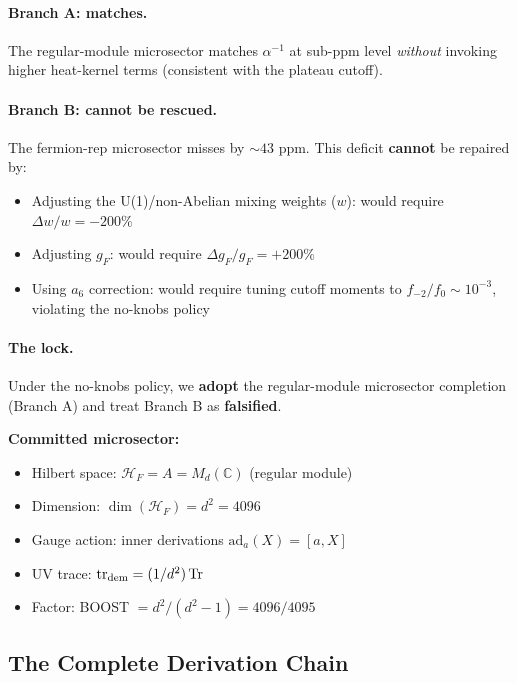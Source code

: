 \paragraph{Branch A: matches.}
The regular-module microsector matches $\alpha^{-1}$ at sub-ppm level \emph{without} invoking higher heat-kernel terms (consistent with the plateau cutoff).

\paragraph{Branch B: cannot be rescued.}
The fermion-rep microsector misses by $\sim 43$ ppm. This deficit \textbf{cannot} be repaired by:
\begin{itemize}
\item Adjusting the U(1)/non-Abelian mixing weights ($w$): would require $\Delta w/w = -200\%$
\item Adjusting $g_F$: would require $\Delta g_F/g_F = +200\%$
\item Using $a_6$ correction: would require tuning cutoff moments to $f_{-2}/f_0 \sim 10^{-3}$, violating the no-knobs policy
\end{itemize}
\paragraph{The lock.}\mbox{}

\begin{tcolorbox}[colback=green!5!white, colframe=green!50!black, title=Microsector Lock]
Under the no-knobs policy, we \textbf{adopt} the regular-module microsector completion (Branch A) and treat Branch B as \textbf{falsified}.

\textbf{Committed microsector:}
\begin{itemize}
\item Hilbert space: $\mathcal{H}_F = A = M_d(\mathbb{C})$ (regular module)
\item Dimension: $\dim(\mathcal{H}_F) = d^2 = 4096$
\item Gauge action: inner derivations $\mathrm{ad}_a(X) = [a, X]$
\item UV trace: $\mathrm{tr}_{\rm dem} = (1/d^2)\,\mathrm{Tr}$
\item Factor: BOOST $= d^2/(d^2 - 1) = 4096/4095$
\end{itemize}
\end{tcolorbox}

\subsection{The Complete Derivation Chain}\label{sec:alpha-chain}

